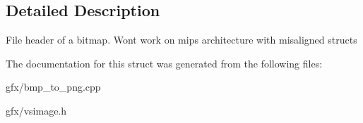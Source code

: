\subsection{Detailed Description}
File header of a bitmap. Won\textquotesingle{}t work on mips architecture with misaligned structs 

The documentation for this struct was generated from the following files\+:\begin{DoxyCompactItemize}
\item 
gfx/bmp\+\_\+to\+\_\+png.\+cpp\item 
gfx/vsimage.\+h\end{DoxyCompactItemize}
